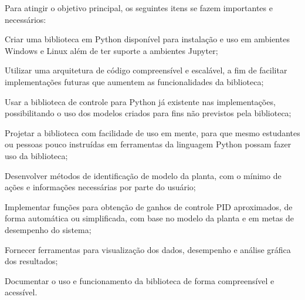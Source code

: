 Para atingir o objetivo principal, os seguintes itens se fazem importantes e necessários:
\begin{alineas}
    \item \label{itm:oe1} Criar uma biblioteca em Python disponível para instalação e uso em ambientes Windows e Linux
    além de ter suporte a ambientes Jupyter;
    \item \label{itm:oe2} Utilizar uma arquitetura de código compreensível e escalável, a fim de facilitar implementações futuras
    que aumentem as funcionalidades da biblioteca;
    \item \label{itm:oe3} Usar a biblioteca de controle para Python já existente nas implementações, possibilitando o uso dos modelos
    criados para fins não previstos pela biblioteca;
    \item \label{itm:oe4} Projetar a biblioteca com facilidade de uso em mente, para que mesmo estudantes ou pessoas pouco instruídas
    em ferramentas da linguagem Python possam fazer uso da biblioteca;
    \item \label{itm:oe5} Desenvolver métodos de identificação de modelo da planta, com o mínimo de ações e informações necessárias por
    parte do usuário;
    \item \label{itm:oe6} Implementar funções para obtenção de ganhos de controle PID aproximados, de forma automática ou simplificada,
    com base no modelo da planta e em metas de desempenho do sistema;
    \item \label{itm:oe7} Fornecer ferramentas para visualização dos dados, desempenho e análise gráfica dos resultados;
    \item \label{itm:oe8} Documentar o uso e funcionamento da biblioteca de forma compreensível e acessível.
\end{alineas}
